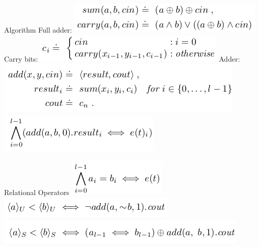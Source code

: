 \documentclass{beamer}
\begin{document}
\begin{frame}{Algorithm}
Full adder:\newline
\includegraphics[scale=0.5]{sum1.png}\newline
Carry bits:\newline
\includegraphics[scale=0.5]{sum2.png}\newline
Adder:\newline
\includegraphics[scale=0.5]{sum3.png}\newline
\includegraphics[scale=0.5]{sum4.png}\newline
\end{frame}

\begin{frame}{Relational Operators}
\includegraphics[scale=0.5]{rel1.png}\newline
\includegraphics[scale=0.5]{rel2.png}\newline
\includegraphics[scale=0.5]{rel3.png}\newline
\end{frame}
\end{document}
